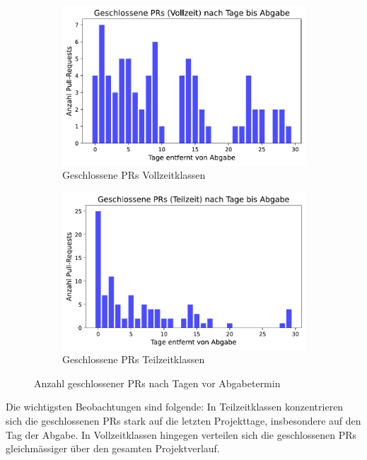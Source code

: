 \begin{figure}[htbp] 
\centering \begin{subfigure}[b]{0.48\textwidth} 
\centering \includegraphics[width=\textwidth]{Figures/closed-prs-projektzeit-vollzeit.pdf} 
\caption{Geschlossene PRs Vollzeitklassen} 
\label{fig:closed-prs-projektkeit-vollzeit}
\end{subfigure} 
\hfill 
\begin{subfigure}[b]{0.48\textwidth} 
\centering \includegraphics[width=\textwidth]{Figures/closed-prs-projektzeit-teilzeit.pdf} 
\caption{Geschlossene PRs Teilzeitklassen} 
\label{fig:closed-prs-projektkeit-teilzeit} 
\end{subfigure} 
\caption{Anzahl geschlossener PRs nach Tagen vor Abgabetermin} 
\label{fig:closed-prs-projektzeit} 
\end{figure}

Die wichtigsten Beobachtungen sind folgende: In Teilzeitklassen konzentrieren sich die geschlossenen PRs stark auf die letzten Projekttage, insbesondere auf den Tag der Abgabe. In Vollzeitklassen hingegen verteilen sich die geschlossenen PRs gleichmässiger über den gesamten Projektverlauf.



